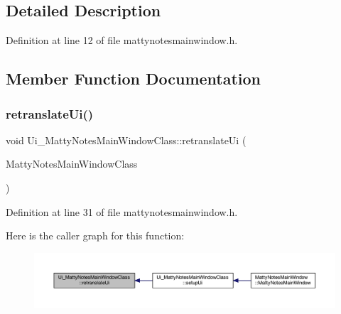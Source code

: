 \subsection{Detailed Description}


Definition at line 12 of file mattynotesmainwindow.\+h.



\subsection{Member Function Documentation}
\hypertarget{classUi__MattyNotesMainWindowClass_a306861cb3bb46bfae41abff489d7d785}{}\label{classUi__MattyNotesMainWindowClass_a306861cb3bb46bfae41abff489d7d785} 
\subsubsection{\texorpdfstring{retranslate\+Ui()}{retranslateUi()}}
{\footnotesize\ttfamily void Ui\+\_\+\+Matty\+Notes\+Main\+Window\+Class\+::retranslate\+Ui (\begin{DoxyParamCaption}\item[{Q\+Main\+Window $\ast$}]{Matty\+Notes\+Main\+Window\+Class }\end{DoxyParamCaption})\hspace{0.3cm}{\ttfamily [inline]}}



Definition at line 31 of file mattynotesmainwindow.\+h.

Here is the caller graph for this function\+:
\nopagebreak
\begin{figure}[H]
\begin{center}
\leavevmode
\includegraphics[width=350pt]{classUi__MattyNotesMainWindowClass_a306861cb3bb46bfae41abff489d7d785_icgraph}
\end{center}
\end{figure}
\hypertarget{classUi__MattyNotesMainWindowClass_abae561e16be81d038b0fb3f8216a3444}{}\label{classUi__MattyNotesMainWindowClass_abae561e16be81d038b0fb3f8216a3444} 
